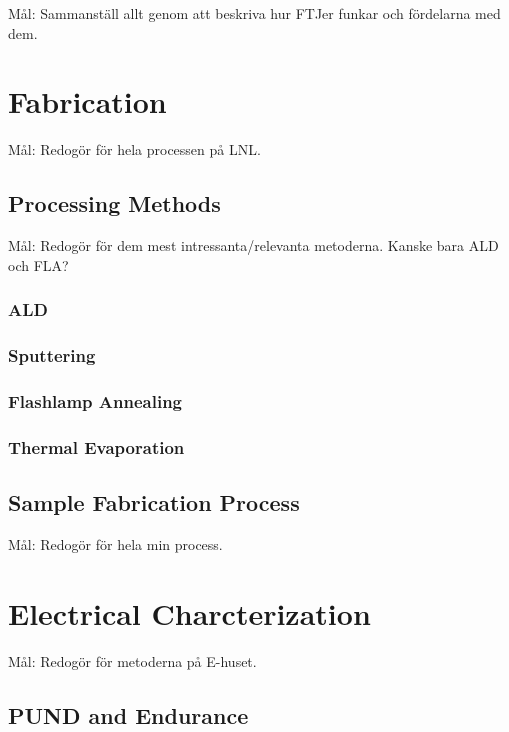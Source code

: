 \documentclass[11pt]{article}
\begin{document}
        Mål: Sammanställ allt genom att beskriva hur FTJer funkar och fördelarna med dem.

    \section{Fabrication}

    Mål: Redogör för hela processen på LNL.\ 

        \subsection{Processing Methods}

        Mål: Redogör för dem mest intressanta/relevanta metoderna. Kanske bara ALD och FLA?\ 

            \subsubsection{ALD}


            \subsubsection{Sputtering}


            \subsubsection{Flashlamp Annealing}


            \subsubsection{Thermal Evaporation}


        \subsection{Sample Fabrication Process}

        Mål: Redogör för hela min process.

    \section{Electrical Charcterization}

    Mål: Redogör för metoderna på E-huset.

        \subsection{PUND and Endurance}
\end{document}
